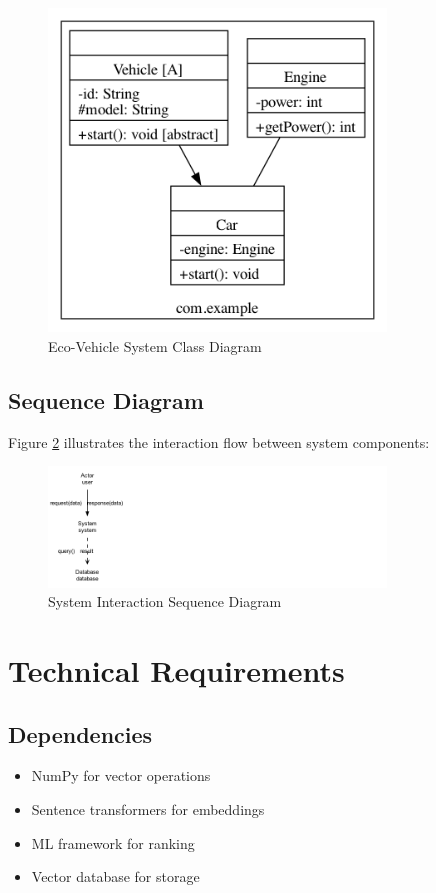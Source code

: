 \documentclass[12pt,a4paper]{article}
\begin{document}
\begin{figure}[h]
    \centering
    \includegraphics[width=0.8\textwidth]{example_class_diagram}
    \caption{Eco-Vehicle System Class Diagram}
    \label{fig:class_diagram}
\end{figure}

\subsection{Sequence Diagram}
Figure \ref{fig:sequence_diagram} illustrates the interaction flow between system components:

\begin{figure}[h]
    \centering
    \includegraphics[width=0.8\textwidth]{simple_sequence}
    \caption{System Interaction Sequence Diagram}
    \label{fig:sequence_diagram}
\end{figure}

\section{Technical Requirements}
\subsection{Dependencies}
\begin{itemize}
    \item NumPy for vector operations
    \item Sentence transformers for embeddings
    \item ML framework for ranking
    \item Vector database for storage
\end{itemize}
\end{document}
